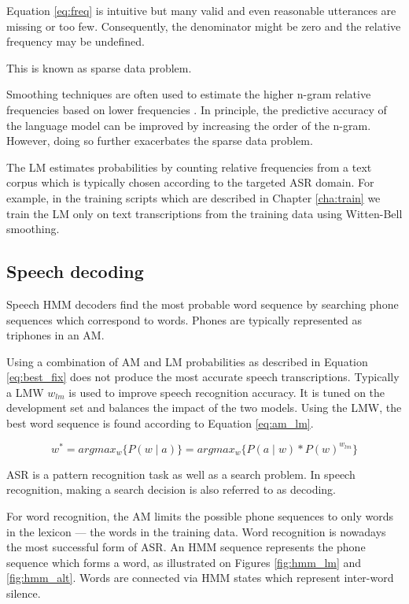 Equation \ref{eq:freq} is intuitive but many valid and even reasonable utterances are missing or too few. Consequently, the denominator might be zero and the relative frequency may be undefined.


This is known as sparse data problem.


Smoothing techniques are often used to estimate the higher n-gram relative frequencies based on lower frequencies \cite{goodman2001bit}. In principle, the predictive accuracy of the language model can be improved by increasing the order of the n-gram. However, doing so further exacerbates the sparse data problem.\cite{brants2007large}

The \ac{LM} estimates probabilities by counting relative frequencies from a text corpus which is typically chosen according to the targeted \ac{ASR} domain. For example, in the training scripts which are described in Chapter \ref{cha:train} we train the \ac{LM} only on text transcriptions from the training data using Witten-Bell smoothing.\cite{witten1991zero}

\subsection{Speech decoding}
\label{sub:decode}
Speech \ac{HMM} decoders find the most probable word sequence by searching phone sequences which correspond to words. Phones are typically represented as triphones in an \ac{AM}.

Using a combination of \ac{AM} and \ac{LM} probabilities as described in Equation \ref{eq:best_fix} does not produce the most accurate speech transcriptions. Typically a \ac{LMW} $w_{lm}$ is used to improve speech recognition accuracy. It is tuned on the development set and balances the impact of the two models. Using the \ac{LMW}, the best word sequence is found according to Equation \ref{eq:am_lm}.

\begin{equation}\label{eq:am_lm}
  w^* = argmax_{w}\{P(w \mid a)\} = argmax_{w}\{P(a \mid w) * P(w)^{w_{lm}}\}
\end{equation}

\ac{ASR} is a pattern recognition task as well as a search problem. In speech recognition, making a search decision is also referred to as decoding.\cite{huang2001spoken}

For word recognition, the \ac{AM} limits the possible phone sequences to only words in the lexicon --- the words in the training data. Word recognition is nowadays the most successful form of \ac{ASR}. An \ac{HMM} sequence represents the phone sequence which forms a word, as illustrated on Figures \ref{fig:hmm_lm} and \ref{fig:hmm_alt}. Words are connected via \ac{HMM} states which represent inter-word silence.


